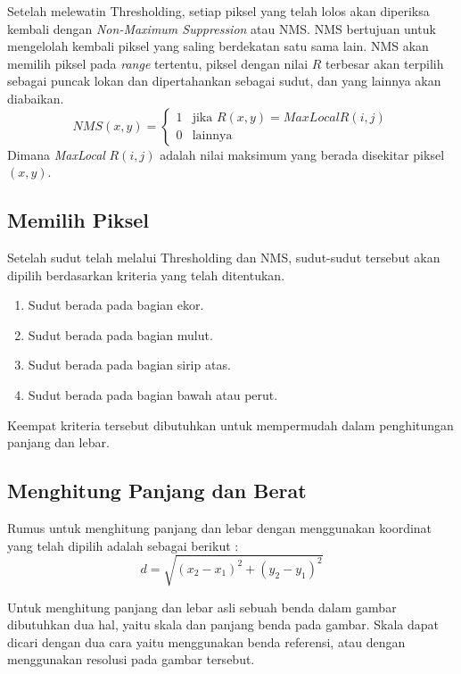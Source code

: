     Setelah melewatin Thresholding, setiap piksel yang telah lolos akan diperiksa kembali dengan \emph{Non-Maximum Suppression} atau NMS.
NMS bertujuan untuk mengelolah kembali piksel yang saling berdekatan satu sama lain. NMS akan memilih piksel pada \emph{range} tertentu, piksel dengan nilai \(R\) terbesar akan terpilih sebagai puncak lokan dan dipertahankan sebagai sudut, dan yang lainnya akan diabaikan.
\begin{equation*}
    NMS(x,y) =
    \begin{cases}
        1 & \text{jika } R(x,y) = MaxLocal R(i,j) \\
        0 & \text{lainnya }
    \end{cases}
\end{equation*}
Dimana \emph{MaxLocal} \(R(i,j)\) adalah nilai maksimum yang berada disekitar piksel \((x,y)\).

\subsection{Memilih Piksel}
    Setelah sudut telah melalui Thresholding dan NMS, sudut-sudut tersebut akan dipilih berdasarkan kriteria yang telah ditentukan.
\begin{enumerate}
    \item Sudut berada pada bagian ekor.
    \item Sudut berada pada bagian mulut.
    \item Sudut berada pada bagian sirip atas.
    \item Sudut berada pada bagian bawah atau perut.
\end{enumerate}

Keempat kriteria tersebut dibutuhkan untuk mempermudah dalam penghitungan panjang dan lebar.


\subsection{Menghitung Panjang dan Berat}
    Rumus untuk menghitung panjang dan lebar dengan menggunakan koordinat yang telah dipilih adalah sebagai berikut :
\begin{equation}
    d = \sqrt{(x_2 - x_1)^2 + (y_2 - y_1)^2}
\end{equation}    

    Untuk menghitung panjang dan lebar asli sebuah benda dalam gambar dibutuhkan dua hal, yaitu skala dan panjang benda pada gambar.
Skala dapat dicari dengan dua cara yaitu menggunakan benda referensi, atau dengan menggunakan resolusi pada gambar tersebut.
    
